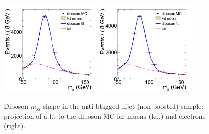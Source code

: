 \begin{figure}
\begin{center}
\includegraphics[width=0.45\textwidth]{figs/wpj/Dibosonlnujj_diboson_muon_2jets.png}
\includegraphics[width=0.45\textwidth]{figs/wpj/Dibosonlnujj_diboson_electron_2jets.png}
\end{center}
\caption{\label{fig:dibosonFit} Diboson $m_{jj}$ shape in the anti-btagged dijet (non-boosted) sample: projection of a fit to the diboson MC for muons (left) and electrons (right).}
\label{fig:dibosonFit_Dijet}
\end{figure}
